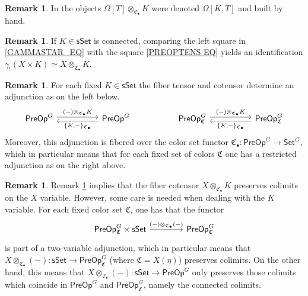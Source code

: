 \documentclass[a4paper,10pt
,draft
]{article}%
\numberwithin{equation}{section}
\numberwithin{figure}{section}
\theoremstyle{definition} %
\newtheorem{remark}[equation]{Remark}%
\newcommand{\1}{\ensuremath{\mathbbm 1}}%
\begin{document}
\begin{remark}
	In \cite[\S 7.1]{CM13b}
	the objects
	$\Omega[T] \otimes_{\mathfrak{C}_{\bullet}} K$ were denoted 
	$\Omega[K,T]$
	and built by hand.
\end{remark}


\begin{remark}\label{OTIMCON REM}
	If $K \in \mathsf{sSet}$ is connected,
	comparing the left square in \eqref{GAMMASTAR_EQ}
	with the square \eqref{PREOPTENS EQ} yields an identification
	$\gamma_! \left(X \times K\right) \simeq 
	X \otimes_{\mathfrak{C}_{\bullet}} K$.
\end{remark}


\begin{remark}\label{TENSCOADJ REM}
	For each fixed $K \in \mathsf{sSet}$
	the fiber tensor and cotensor 
	determine an adjunction as on the left below.
\[
\begin{tikzcd}[column sep =50]
	\mathsf{PreOp}^G \ar[shift left=1]{r}
	{(-) \otimes_{\mathfrak{C}_{\bullet}} K}
&
	\mathsf{PreOp}^G \ar[shift left=1]{l}
	{\{K,-\}_{\mathfrak{C}_{\bullet}}}
&
	\mathsf{PreOp}^G_{\mathfrak{C}} \ar[shift left=1]{r}
	{(-) \otimes_{\mathfrak{C}_{\bullet}} K}
&
	\mathsf{PreOp}^G_{\mathfrak{C}} \ar[shift left=1]{l}
	{\{K,-\}_{\mathfrak{C}_{\bullet}}}
\end{tikzcd}
\]
Moreover, this adjunction is fibered over the color set functor
$\mathfrak{C}_{\bullet} \colon
\mathsf{PreOp}^G \to \mathsf{Set}^G$,
which in particular means that for each fixed set of colors
$\mathfrak{C}$
one has a restricted adjunction as on the right above.
\end{remark}

\begin{remark}
	Remark \ref{TENSCOADJ REM} implies that the fiber cotensor
	$X \otimes_{\mathfrak{C}_{\bullet}} K$
	preserves colimits on the $X$ variable.
	However, some care is needed when dealing with the 
	$K$ variable.
	For each fixed color set $\mathfrak{C}$, one has that the functor
\[
\begin{tikzcd}[row sep = 0, column sep = 40pt]
	\mathsf{PreOp}^G_{\mathfrak{C}} \times \mathsf{sSet} \ar{r}{(-)\otimes_{\mathfrak{C}_{\bullet}}(-)} 
&
	\mathsf{PreOp}^G_{\mathfrak{C}}
\end{tikzcd}
\]
is part of a two-variable adjunction,
which in particular means that
$X \otimes_{\mathfrak{C}_{\bullet}} (-) \colon 
\mathsf{sSet} \to \mathsf{PreOp}^G_{\mathfrak{C}}$ 
(where $\mathfrak{C}=X(\eta)$)
preserves colimits.
On the other hand, this means that
$X \otimes_{\mathfrak{C}_{\bullet}} (-) \colon
\mathsf{sSet} \to \mathsf{PreOp}^G$
only preserves those colimits which coincide in
$\mathsf{PreOp}^G$ and $\mathsf{PreOp}^G_{\mathfrak{C}}$,
namely the connected colimits.
\end{remark}
\end{document}
